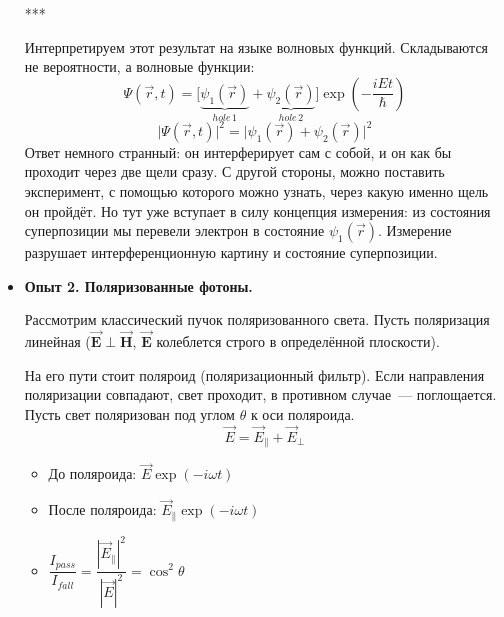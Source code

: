 \begin{itemize}
  ***

  Интерпретируем этот результат на языке волновых функций. Складываются не вероятности, а волновые функции:
  $$
    \Psi(\vec r, t) = \Big[
        \underbrace{\psi_1(\vec r)}_{hole \, 1} + \underbrace{\psi_2(\vec r)}_{hole \, 2}
    \Big] \exp{\left(-\dfrac{i E t}{\hbar}\right)}
  $$
  $$
    \big| \Psi(\vec r, t)\big|^2 = \Big| \psi_1(\vec r) + \psi_2 (\vec r) \Big|^2
  $$
  \Ans Ответ немного странный: он интерферирует сам с собой, и он как бы проходит через две щели сразу. С другой стороны, можно поставить эксперимент, с помощью которого можно узнать, через какую именно щель он пройдёт. Но тут уже вступает в силу концепция измерения: из состояния суперпозиции мы перевели электрон в состояние $\psi_1(\vec r)$. Измерение разрушает интерференционную картину и состояние суперпозиции.
  \item \textbf{Опыт 2. Поляризованные фотоны.}

  Рассмотрим классический пучок поляризованного света. Пусть поляризация линейная ($ \vec{\mathbf{E}} \perp \vec{\mathbf{H}}$,
  $\vec{\mathbf{E}}$ колеблется строго в определённой плоскости).

  На его пути стоит поляроид (поляризационный фильтр). Если направления поляризации совпадают, свет проходит, в противном случае~--- поглощается. Пусть свет поляризован под углом $\theta$ к оси поляроида.
  $$
    \vec E = \vec E_{\|} + \vec E_{\perp}
  $$
  \begin{itemize}
    \item До поляроида: $\vec E \exp(-i \omega t)$
    \item После поляроида: $\vec E_{\|} \exp(-i\omega t)$
    \item $\dfrac{I_{pass}}{I_{fall}} = \dfrac{|\vec E_{\|}|^2}{|\vec E|^2} = \cos^2 \theta$
  \end{itemize}
\begin{center}
\end{center}


\end{itemize}
